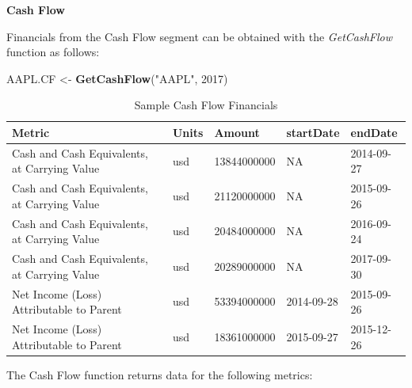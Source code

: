 \documentclass[]{book}
\newenvironment{Shaded}{\begin{snugshade}}{\end{snugshade}}
\newcommand{\KeywordTok}[1]{\textcolor[rgb]{0.13,0.29,0.53}{\textbf{#1}}}
\newcommand{\DecValTok}[1]{\textcolor[rgb]{0.00,0.00,0.81}{#1}}
\newcommand{\StringTok}[1]{\textcolor[rgb]{0.31,0.60,0.02}{#1}}
\newcommand{\NormalTok}[1]{#1}
\theoremstyle{definition}
\theoremstyle{definition}
\theoremstyle{definition}
\theoremstyle{remark}
\begin{document}
\textbf{Cash Flow}

Financials from the Cash Flow segment can be obtained with the
\emph{GetCashFlow} function as follows:

\begin{Shaded}
\begin{Highlighting}[]
\NormalTok{AAPL.CF <-}\StringTok{ }\KeywordTok{GetCashFlow}\NormalTok{(}\StringTok{"AAPL"}\NormalTok{, }\DecValTok{2017}\NormalTok{)}
\end{Highlighting}
\end{Shaded}

\begin{table}[t]

\caption{\label{tab:unnamed-chunk-31}Sample Cash Flow Financials}
\centering
\begin{tabular}{lllll}
\toprule
Metric & Units & Amount & startDate & endDate\\
\midrule
Cash and Cash Equivalents, at Carrying Value & usd & 13844000000 & NA & 2014-09-27\\
Cash and Cash Equivalents, at Carrying Value & usd & 21120000000 & NA & 2015-09-26\\
Cash and Cash Equivalents, at Carrying Value & usd & 20484000000 & NA & 2016-09-24\\
Cash and Cash Equivalents, at Carrying Value & usd & 20289000000 & NA & 2017-09-30\\
Net Income (Loss) Attributable to Parent & usd & 53394000000 & 2014-09-28 & 2015-09-26\\
\addlinespace
Net Income (Loss) Attributable to Parent & usd & 18361000000 & 2015-09-27 & 2015-12-26\\
\bottomrule
\end{tabular}
\end{table}

The Cash Flow function returns data for the following metrics:
\end{document}
